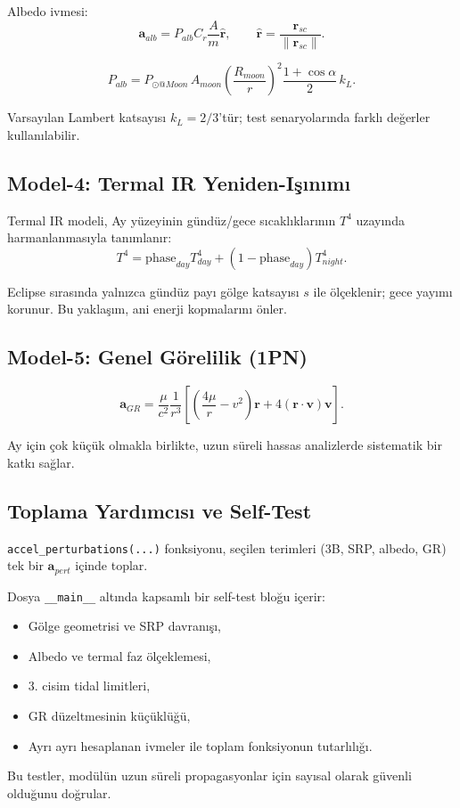 Albedo ivmesi:
\[
\mathbf{a}_{alb}
=
P_{alb} C_r\frac{A}{m}\hat{\mathbf{r}},
\qquad
\hat{\mathbf{r}}=\frac{\mathbf{r}_{sc}}{\|\mathbf{r}_{sc}\|}.
\]

\[
P_{alb}
=
P_{\odot@Moon}\,
A_{moon}\left(\frac{R_{moon}}{r}\right)^2
\frac{1+\cos\alpha}{2}\,k_{L}.
\]

Varsayılan Lambert katsayısı $k_L=2/3$’tür;
test senaryolarında farklı değerler kullanılabilir.

\subsection*{Model-4: Termal IR Yeniden-Işınımı}

Termal IR modeli, Ay yüzeyinin
gündüz/gece sıcaklıklarının
$T^4$ uzayında harmanlanmasıyla tanımlanır:
\[
T^4=
\mathrm{phase}_{day}T_{day}^4+
(1-\mathrm{phase}_{day})T_{night}^4.
\]

Eclipse sırasında yalnızca gündüz payı
gölge katsayısı $s$ ile ölçeklenir;
gece yayımı korunur.
Bu yaklaşım, ani enerji kopmalarını önler.

\subsection*{Model-5: Genel Görelilik (1PN)}

\[
\mathbf{a}_{GR}=\frac{\mu}{c^2}\frac{1}{r^3}
\left[
\left(\frac{4\mu}{r}-v^2\right)\mathbf{r}
+4(\mathbf{r}\cdot\mathbf{v})\mathbf{v}
\right].
\]

Ay için çok küçük olmakla birlikte, uzun süreli hassas analizlerde
sistematik bir katkı sağlar.

\subsection*{Toplama Yardımcısı ve Self-Test}

\texttt{accel\_perturbations(...)} fonksiyonu,
seçilen terimleri (3B, SRP, albedo, GR)
tek bir $\mathbf{a}_{pert}$ içinde toplar.

Dosya \texttt{\_\_main\_\_} altında
kapsamlı bir self-test bloğu içerir:
\begin{itemize}
  \item Gölge geometrisi ve SRP davranışı,
  \item Albedo ve termal faz ölçeklemesi,
  \item 3. cisim tidal limitleri,
  \item GR düzeltmesinin küçüklüğü,
  \item Ayrı ayrı hesaplanan ivmeler ile
        toplam fonksiyonun tutarlılığı.
\end{itemize}
Bu testler, modülün
uzun süreli propagasyonlar için
sayısal olarak güvenli olduğunu doğrular.




